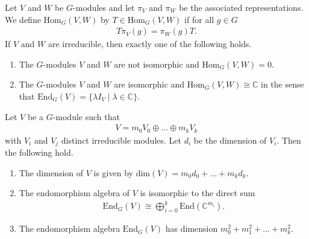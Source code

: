 \begin{lemma}\label{lem:schurs-lemma}
    Let $V$ and $W$ be $G$-modules and let $\pi_V$ and $\pi_W$ be the associated representations.
    We define $\mathrm{Hom}_G(V, W)$ by $T \in \mathrm{Hom}_G(V, W)$ if for all $g \in G$
    \begin{align}
        T \pi_V(g) = \pi_W(g) T.
    \end{align}
    If $V$ and $W$ are irreducible, then exactly one of the following holds.
    \begin{enumerate}
        \item The $G$-modules $V$ and $W$ are not isomorphic and $\mathrm{Hom}_G(V,W) = 0$.
        \item The $G$-modules $V$ and $W$ are isomorphic and $\mathrm{Hom}_G(V,W) \cong \mathbb{C}$ in the sense that $\mathrm{End}_G(V) = \{ \lambda I_V \mid \lambda \in \mathbb{C} \}$.
    \end{enumerate}
\end{lemma}

\begin{cor}
    Let $V$ be a $G$-module such that
    \begin{align}
        V = m_0 V_0 \oplus \dots \oplus m_k V_k
    \end{align}
    with $V_i$ and $V_j$ distinct irreducible modules.
    Let $d_i$ be the dimension of $V_i$.
    Then the following hold.
    \begin{enumerate}
        \item The dimension of $V$ is given by $\mathrm{dim}(V) = m_0 d_0 + \dots + m_k d_k$.
        \item \label{item:artin-wedderburn} The endomorphism algebra of $V$ is isomorphic to the direct sum
        \begin{align}
            \mathrm{End}_G(V) \cong \bigoplus_{i = 0}^k \mathrm{End}(\mathbb{C}^{m_i}).
        \end{align}
        \item The endomorphism algebra $\mathrm{End}_G(V)$ has dimension $m_0^2 + m_1^2 + \dots + m_k^2$.
    \end{enumerate}
\end{cor}

